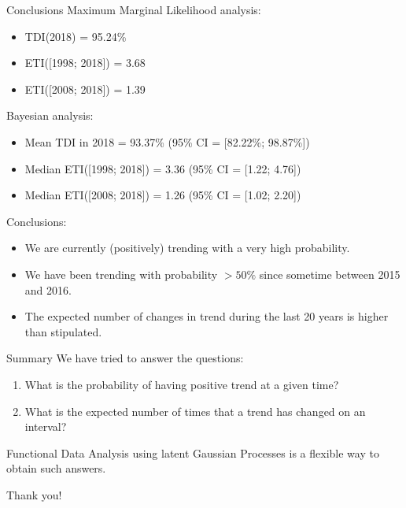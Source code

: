 \documentclass[ignorenonframetext,xcolor=pdflatex,table,dvipsnames,serif]{beamer}
\begin{document}
\begin{frame}{Conclusions}
Maximum Marginal Likelihood analysis:
{\footnotesize
\begin{itemize}
  \item{TDI(2018) = 95.24\%}
  \item{ETI([1998; 2018]) = 3.68}
  \item{ETI([2008; 2018]) = 1.39}
\end{itemize}
}

Bayesian analysis:
{\footnotesize
\begin{itemize}
  \item{Mean TDI in 2018 = 93.37\% (95\% CI = [82.22\%; 98.87\%])}
  \item{Median ETI([1998; 2018]) = 3.36 (95\% CI = [1.22; 4.76])}
  \item{Median ETI([2008; 2018]) = 1.26 (95\% CI = [1.02; 2.20])}
\end{itemize}
}

\pause

\alert{Conclusions:}
{\footnotesize
\begin{itemize}
  \item{We are currently (positively) trending with a very high probability.}
  \item{We have been trending with probability $> 50\%$ since sometime between 2015 and 2016.}
  \item{The expected number of changes in trend during the last 20 years is higher than stipulated.}
\end{itemize}
}
\end{frame}

\begin{frame}{Summary}
We have tried to answer the questions:
\begin{enumerate}
  \item{What is the probability of having positive trend at a given time?}
  \item{What is the expected number of times that a trend has changed on an interval?}
\end{enumerate}

Functional Data Analysis using latent Gaussian Processes is a flexible way to obtain such answers.
\end{frame}




\begin{frame}
\center \Huge Thank you!
\end{frame}
\end{document}
